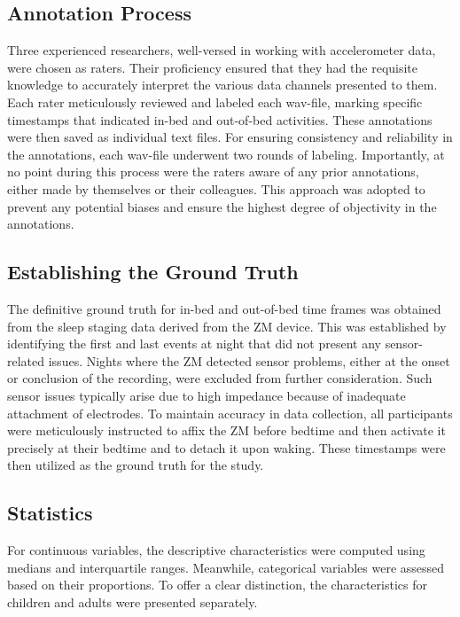 \documentclass[
  10pt,
]{scrbook}
\begin{document}
\hypertarget{annotation-process}{%
\subsection{Annotation Process}\label{annotation-process}}

Three experienced researchers, well-versed in working with accelerometer
data, were chosen as raters. Their proficiency ensured that they had the
requisite knowledge to accurately interpret the various data channels
presented to them. Each rater meticulously reviewed and labeled each
wav-file, marking specific timestamps that indicated in-bed and
out-of-bed activities. These annotations were then saved as individual
text files. For ensuring consistency and reliability in the annotations,
each wav-file underwent two rounds of labeling. Importantly, at no point
during this process were the raters aware of any prior annotations,
either made by themselves or their colleagues. This approach was adopted
to prevent any potential biases and ensure the highest degree of
objectivity in the annotations.

\hypertarget{establishing-the-ground-truth}{%
\subsection{Establishing the Ground
Truth}\label{establishing-the-ground-truth}}

The definitive ground truth for in-bed and out-of-bed time frames was
obtained from the sleep staging data derived from the ZM device. This
was established by identifying the first and last events at night that
did not present any sensor-related issues. Nights where the ZM detected
sensor problems, either at the onset or conclusion of the recording,
were excluded from further consideration. Such sensor issues typically
arise due to high impedance because of inadequate attachment of
electrodes. To maintain accuracy in data collection, all participants
were meticulously instructed to affix the ZM before bedtime and then
activate it precisely at their bedtime and to detach it upon waking.
These timestamps were then utilized as the ground truth for the study.

\hypertarget{statistics}{%
\subsection{Statistics}\label{statistics}}

For continuous variables, the descriptive characteristics were computed
using medians and interquartile ranges. Meanwhile, categorical variables
were assessed based on their proportions. To offer a clear distinction,
the characteristics for children and adults were presented separately.
\end{document}
